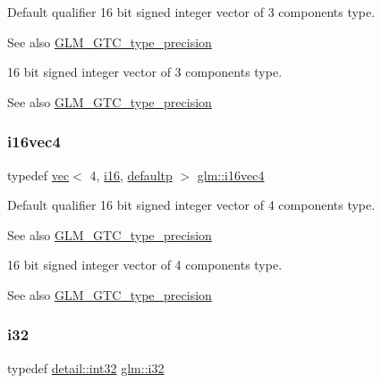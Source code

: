 Default qualifier 16 bit signed integer vector of 3 components type. \begin{DoxySeeAlso}{See also}
\hyperlink{group__gtc__type__precision}{G\+L\+M\+\_\+\+G\+T\+C\+\_\+type\+\_\+precision}
\end{DoxySeeAlso}
16 bit signed integer vector of 3 components type. \begin{DoxySeeAlso}{See also}
\hyperlink{group__gtc__type__precision}{G\+L\+M\+\_\+\+G\+T\+C\+\_\+type\+\_\+precision} 
\end{DoxySeeAlso}
\mbox{\label{group__gtc__type__precision_ga99a249a4cc129cb527c48d3afd38b666}} 
\subsubsection{\texorpdfstring{i16vec4}{i16vec4}}
{\footnotesize\ttfamily typedef \hyperlink{structglm_1_1vec}{vec}$<$ 4, \hyperlink{group__gtc__type__precision_ga35e5542ca05b29cc256fdafb8503d1fd}{i16}, \hyperlink{namespaceglm_a36ed105b07c7746804d7fdc7cc90ff25a9d21ccd8b5a009ec7eb7677befc3bf51}{defaultp} $>$ \hyperlink{group__gtc__type__precision_ga99a249a4cc129cb527c48d3afd38b666}{glm\+::i16vec4}}

Default qualifier 16 bit signed integer vector of 4 components type. \begin{DoxySeeAlso}{See also}
\hyperlink{group__gtc__type__precision}{G\+L\+M\+\_\+\+G\+T\+C\+\_\+type\+\_\+precision}
\end{DoxySeeAlso}
16 bit signed integer vector of 4 components type. \begin{DoxySeeAlso}{See also}
\hyperlink{group__gtc__type__precision}{G\+L\+M\+\_\+\+G\+T\+C\+\_\+type\+\_\+precision} 
\end{DoxySeeAlso}
\mbox{\label{group__gtc__type__precision_ga1d8ed5c43e91ea7d4528389da4fa9524}} 
\subsubsection{\texorpdfstring{i32}{i32}}
{\footnotesize\ttfamily typedef \hyperlink{namespaceglm_1_1detail_a9f85b4efeca416cdcec2fd08939a2e17}{detail\+::int32} \hyperlink{group__gtc__type__precision_ga1d8ed5c43e91ea7d4528389da4fa9524}{glm\+::i32}}

